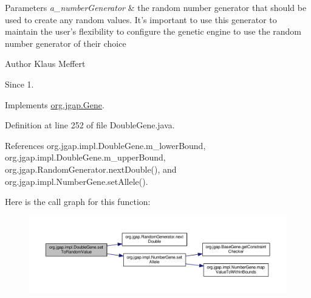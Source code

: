 \begin{DoxyParams}{Parameters}
{\em a\-\_\-number\-Generator} & the random number generator that should be used to create any random values. It's important to use this generator to maintain the user's flexibility to configure the genetic engine to use the random number generator of their choice\\
\hline
\end{DoxyParams}
\begin{DoxyAuthor}{Author}
Klaus Meffert 
\end{DoxyAuthor}
\begin{DoxySince}{Since}
1. 
\end{DoxySince}


Implements \hyperlink{interfaceorg_1_1jgap_1_1_gene_a4ef135da7549ee98139928e21adb841a}{org.\-jgap.\-Gene}.



Definition at line 252 of file Double\-Gene.\-java.



References org.\-jgap.\-impl.\-Double\-Gene.\-m\-\_\-lower\-Bound, org.\-jgap.\-impl.\-Double\-Gene.\-m\-\_\-upper\-Bound, org.\-jgap.\-Random\-Generator.\-next\-Double(), and org.\-jgap.\-impl.\-Number\-Gene.\-set\-Allele().



Here is the call graph for this function\-:
\nopagebreak
\begin{figure}[H]
\begin{center}
\leavevmode
\includegraphics[width=350pt]{classorg_1_1jgap_1_1impl_1_1_double_gene_aa60b29de6b26966ef4038bc02ccc2fd7_cgraph}
\end{center}
\end{figure}


